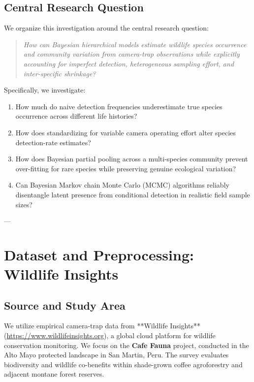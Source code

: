 \documentclass[11pt,a4paper]{article}
\begin{document}
\subsection{Central Research Question}
We organize this investigation around the central research question:
\begin{quote}
\textit{How can Bayesian hierarchical models estimate wildlife species occurrence and community variation from camera-trap observations while explicitly accounting for imperfect detection, heterogeneous sampling effort, and inter-specific shrinkage?}
\end{quote}

Specifically, we investigate:
\begin{enumerate}
    \item How much do naive detection frequencies underestimate true species occurrence across different life histories?
    \item How does standardizing for variable camera operating effort alter species detection-rate estimates?
    \item How does Bayesian partial pooling across a multi-species community prevent over-fitting for rare species while preserving genuine ecological variation?
    \item Can Bayesian Markov chain Monte Carlo (MCMC) algorithms reliably disentangle latent presence from conditional detection in realistic field sample sizes?
\end{enumerate}

---

\section{Dataset and Preprocessing: Wildlife Insights}

\subsection{Source and Study Area}
We utilize empirical camera-trap data from **Wildlife Insights** (\url{https://www.wildlifeinsights.org}), a global cloud platform for wildlife conservation monitoring. We focus on the \textbf{Cafe Fauna} project, conducted in the Alto Mayo protected landscape in San Martin, Peru. The survey evaluates biodiversity and wildlife co-benefits within shade-grown coffee agroforestry and adjacent montane forest reserves.
\end{document}
